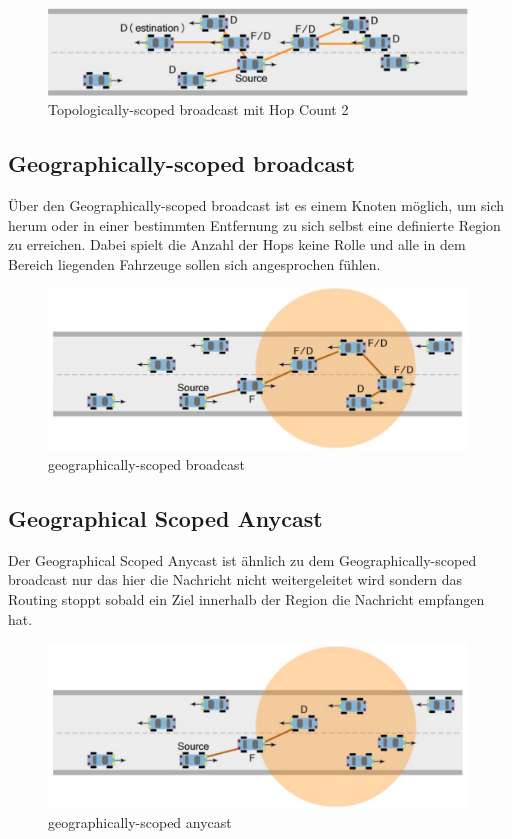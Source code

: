 \begin{figure}
\includegraphics[width=0.99\textwidth]{content/images/03_networklayer/TSC.png}
\caption{Topologically-scoped broadcast mit Hop Count 2 \cite{etsi102636-1}}
\label{fig:tsc}
\end{figure}


\subsection{Geographically-scoped broadcast}
Über den Geographically-scoped broadcast ist es einem Knoten möglich, um sich herum oder in einer bestimmten Entfernung zu sich selbst eine definierte Region zu erreichen. Dabei spielt die Anzahl der Hops keine Rolle und alle in dem Bereich liegenden Fahrzeuge sollen sich angesprochen fühlen.

\begin{figure}
\includegraphics[width=0.99\textwidth]{content/images/03_networklayer/GSB.png}
\caption{geographically-scoped broadcast \cite{etsi102636-1}}
\label{fig:gsb}
\end{figure}

\subsection{Geographical Scoped Anycast}
Der Geographical Scoped Anycast ist ähnlich zu dem Geographically-scoped broadcast nur das hier die Nachricht nicht weitergeleitet wird sondern das Routing stoppt sobald ein Ziel innerhalb der Region die Nachricht empfangen hat.
\begin{figure}
\includegraphics[width=0.99\textwidth]{content/images/03_networklayer/GSA.png}
\caption{geographically-scoped anycast \cite{etsi102636-1}}
\label{fig:gsa}
\end{figure}

